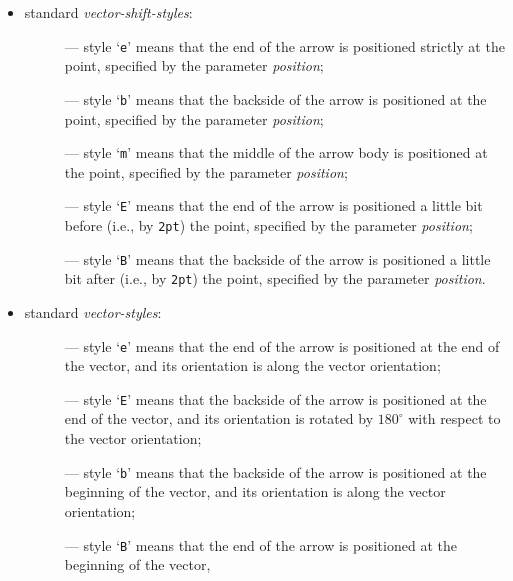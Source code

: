 \begin{itemize}
\item standard {\em vector-shift-styles}:
\begin{description}
\item[]
    --- style `{\tt e}' means that
    the end of the arrow is positioned strictly at the point,
    specified by the parameter {\em position};
\item[]
    --- style `{\tt b}' means that
    the backside of the arrow is positioned at the point,
    specified by the parameter {\em position};
\item[]
    --- style `{\tt m}' means that
    the middle of the arrow body is positioned at the point,
    specified by the parameter {\em position};
\item[]
    --- style `{\tt E}' means that
    the end of the arrow is positioned a little bit before
    (i.e., by {\tt 2pt}) the point,
    specified by the parameter {\em position};
\item[]
    --- style `{\tt B}' means that
    the backside of the arrow is positioned a little bit after
    (i.e., by {\tt 2pt}) the point,
    specified by the parameter {\em position}.
\end{description}
\item standard {\em vector-styles}:
\begin{description}
\item[]
    --- style `{\tt e}' means that
    the end of the arrow is positioned at the end of the vector,
    and its orientation is along the vector orientation;
\item[]
    --- style `{\tt E}' means that
    the backside of the arrow is positioned at the end of the vector,
    and its orientation is rotated by $180^{\circ}$ with
    respect to the vector orientation;
\item[]
    --- style `{\tt b}' means that
    the backside of the arrow is positioned at the beginning of the vector,
    and its orientation is along the vector orientation;
\item[]
    --- style `{\tt B}' means that
    the end of the arrow is positioned at the beginning of the vector,

\end{description}
\end{itemize}
